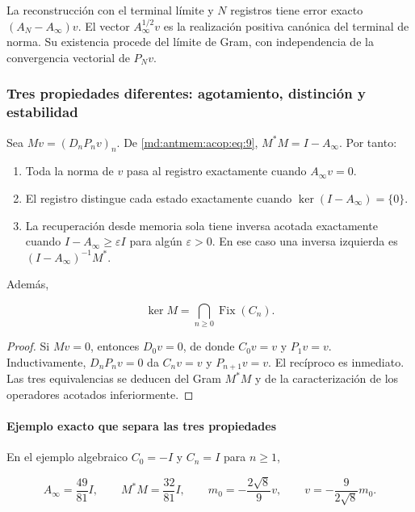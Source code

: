 La reconstrucción con el terminal límite y \(N\) registros tiene error
exacto \((A_N-A_\infty)v\). El vector \(A_\infty^{1/2}v\) es la
realización positiva canónica del terminal de norma. Su existencia procede
del límite de Gram, con independencia de la convergencia vectorial de \(P_Nv\).

\subsubsection{Tres propiedades diferentes: agotamiento, distinción y estabilidad}

Sea \(Mv=(D_nP_nv)_n\). De \eqref{md:antmem:acop:eq:9}, \(M^*M=I-A_\infty\). Por tanto:

\begin{enumerate}
\item Toda la norma de \(v\) pasa al registro exactamente cuando \(A_\infty v=0\).
\item El registro distingue cada estado exactamente cuando \(\ker(I-A_\infty)=\{0\}\).
\item La recuperación desde memoria sola tiene inversa acotada exactamente cuando
\(I-A_\infty\geq\varepsilon I\) para algún \(\varepsilon>0\).
En ese caso una inversa izquierda es \((I-A_\infty)^{-1}M^*\).
\end{enumerate}

Además,

\begin{equation}
\boxed{\ker M=\bigcap_{n\ge0}\operatorname{Fix}(C_n).}
\label{md:antmem:acop:eq:12}
\end{equation}

\begin{proof}
Si \(Mv=0\), entonces \(D_0v=0\), de donde \(C_0v=v\)
y \(P_1v=v\). Inductivamente, \(D_nP_nv=0\) da \(C_nv=v\) y
\(P_{n+1}v=v\). El recíproco es inmediato. Las tres equivalencias se
deducen del Gram \(M^*M\) y de la caracterización de los operadores
acotados inferiormente.
\end{proof}

\paragraph{Ejemplo exacto que separa las tres propiedades}

En el ejemplo algebraico \(C_0=-I\) y \(C_n=I\) para \(n\geq1\),

\begin{equation}
A_\infty=\frac{49}{81}I,\qquad M^*M=\frac{32}{81}I,
\qquad m_0=-\frac{2\sqrt8}{9}v,
\qquad v=-\frac9{2\sqrt8}m_0.
\label{md:antmem:acop:eq:13}
\end{equation}

